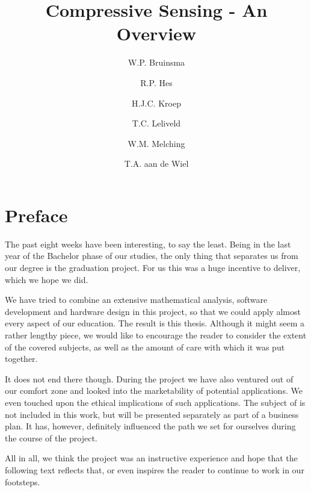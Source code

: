 \documentclass[a4paper, openany, oneside]{memoir}
\title{Compressive Sensing - An Overview}
\author{W.P. Bruinsma \and R.P. Hes \and H.J.C. Kroep \and T.C. Leliveld \and W.M. Melching \and T.A. aan de Wiel}
\begin{document}
\chapter{Preface}
The past eight weeks have been interesting, to say the least. Being in the last year of the Bachelor phase of our studies, the only thing that separates us from our degree is the graduation project. For us this was a huge incentive to deliver, which we hope we did. 

We have tried to combine an extensive mathematical analysis, software development and hardware design in this project, so that we could apply almost every aspect of our education. The result is this thesis. Although it might seem a rather lengthy piece, we would like to encourage the reader to consider the extent of the covered subjects, as well as the amount of care with which it was put together.

It does not end there though. During the project we have also ventured out of our comfort zone and looked into the marketability of potential applications. We even touched upon the ethical implications of such applications. The subject of is not included in this work, but will be presented separately as part of a business plan. It has, however, definitely influenced the path we set for ourselves during the course of the project.

All in all, we think the project was an instructive experience and hope that the following text reflects that, or even inspires the reader to continue to work in our footsteps. 
\end{document}
